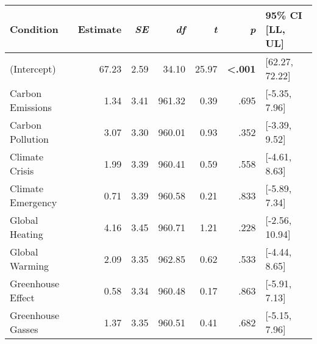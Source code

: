 \begin{table}[ht]
\centering
\begin{tabular}{lrrrrrl}
  \hline
Condition & Estimate & \textit{SE} & \textit{df} & \textit{t} & \textit{p} & 95\% CI [LL, UL] \\ 
  \hline
(Intercept) & 67.23 & 2.59 & 34.10 & 25.97 & \textbf{\textless  .001} & [62.27, 72.22] \\ 
  Carbon Emissions & 1.34 & 3.41 & 961.32 & 0.39 & .695 & [-5.35, 7.96] \\ 
  Carbon Pollution & 3.07 & 3.30 & 960.01 & 0.93 & .352 & [-3.39, 9.52] \\ 
  Climate Crisis & 1.99 & 3.39 & 960.41 & 0.59 & .558 & [-4.61, 8.63] \\ 
  Climate Emergency & 0.71 & 3.39 & 960.58 & 0.21 & .833 & [-5.89, 7.34] \\ 
  Global Heating & 4.16 & 3.45 & 960.71 & 1.21 & .228 & [-2.56, 10.94] \\ 
  Global Warming & 2.09 & 3.35 & 962.85 & 0.62 & .533 & [-4.44, 8.65] \\ 
  Greenhouse Effect & 0.58 & 3.34 & 960.48 & 0.17 & .863 & [-5.91, 7.13] \\ 
  Greenhouse Gasses & 1.37 & 3.35 & 960.51 & 0.41 & .682 & [-5.15, 7.96] \\ 
   \hline
\end{tabular}
\end{table}
